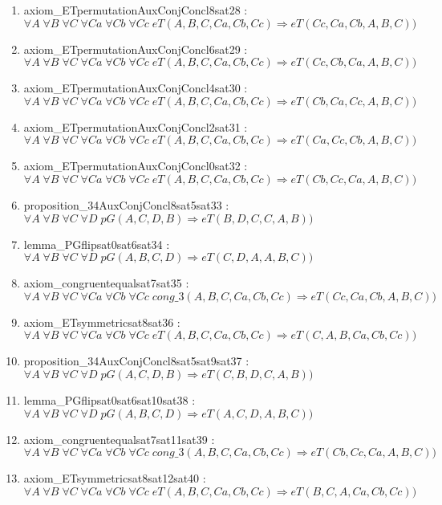 \documentclass{article}
\begin{document}
\begin{enumerate}
\item axiom\_ETpermutationAuxConjConcl8sat28 : $\forall A\;\forall B\;\forall C\;\forall Ca\;\forall Cb\;\forall Cc\;eT(A, B, C, Ca, Cb, Cc) \Rightarrow eT(Cc, Ca, Cb, A, B, C))$
\item axiom\_ETpermutationAuxConjConcl6sat29 : $\forall A\;\forall B\;\forall C\;\forall Ca\;\forall Cb\;\forall Cc\;eT(A, B, C, Ca, Cb, Cc) \Rightarrow eT(Cc, Cb, Ca, A, B, C))$
\item axiom\_ETpermutationAuxConjConcl4sat30 : $\forall A\;\forall B\;\forall C\;\forall Ca\;\forall Cb\;\forall Cc\;eT(A, B, C, Ca, Cb, Cc) \Rightarrow eT(Cb, Ca, Cc, A, B, C))$
\item axiom\_ETpermutationAuxConjConcl2sat31 : $\forall A\;\forall B\;\forall C\;\forall Ca\;\forall Cb\;\forall Cc\;eT(A, B, C, Ca, Cb, Cc) \Rightarrow eT(Ca, Cc, Cb, A, B, C))$
\item axiom\_ETpermutationAuxConjConcl0sat32 : $\forall A\;\forall B\;\forall C\;\forall Ca\;\forall Cb\;\forall Cc\;eT(A, B, C, Ca, Cb, Cc) \Rightarrow eT(Cb, Cc, Ca, A, B, C))$
\item proposition\_34AuxConjConcl8sat5sat33 : $\forall A\;\forall B\;\forall C\;\forall D\;pG(A, C, D, B) \Rightarrow eT(B, D, C, C, A, B))$
\item lemma\_PGflipsat0sat6sat34 : $\forall A\;\forall B\;\forall C\;\forall D\;pG(A, B, C, D) \Rightarrow eT(C, D, A, A, B, C))$
\item axiom\_congruentequalsat7sat35 : $\forall A\;\forall B\;\forall C\;\forall Ca\;\forall Cb\;\forall Cc\;cong\_3(A, B, C, Ca, Cb, Cc) \Rightarrow eT(Cc, Ca, Cb, A, B, C))$
\item axiom\_ETsymmetricsat8sat36 : $\forall A\;\forall B\;\forall C\;\forall Ca\;\forall Cb\;\forall Cc\;eT(A, B, C, Ca, Cb, Cc) \Rightarrow eT(C, A, B, Ca, Cb, Cc))$
\item proposition\_34AuxConjConcl8sat5sat9sat37 : $\forall A\;\forall B\;\forall C\;\forall D\;pG(A, C, D, B) \Rightarrow eT(C, B, D, C, A, B))$
\item lemma\_PGflipsat0sat6sat10sat38 : $\forall A\;\forall B\;\forall C\;\forall D\;pG(A, B, C, D) \Rightarrow eT(A, C, D, A, B, C))$
\item axiom\_congruentequalsat7sat11sat39 : $\forall A\;\forall B\;\forall C\;\forall Ca\;\forall Cb\;\forall Cc\;cong\_3(A, B, C, Ca, Cb, Cc) \Rightarrow eT(Cb, Cc, Ca, A, B, C))$
\item axiom\_ETsymmetricsat8sat12sat40 : $\forall A\;\forall B\;\forall C\;\forall Ca\;\forall Cb\;\forall Cc\;eT(A, B, C, Ca, Cb, Cc) \Rightarrow eT(B, C, A, Ca, Cb, Cc))$

\end{enumerate}
\end{document}
